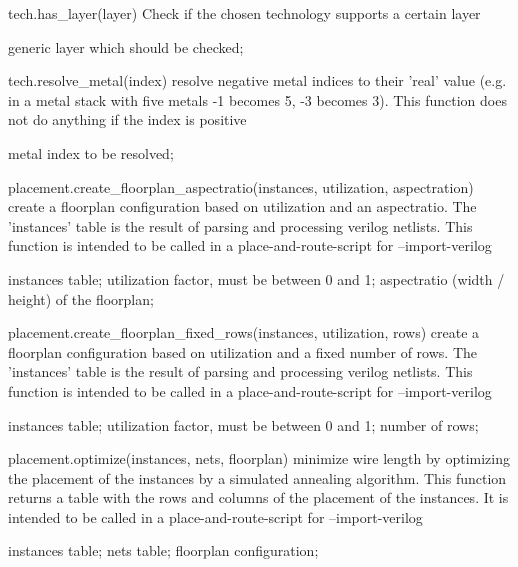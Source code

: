 \begin{APIfunc}{tech.has\_layer(layer)}
    Check if the chosen technology supports a certain layer
    \begin{APIparameters}
            generic layer which should be checked;
    \end{APIparameters}
\end{APIfunc}
\begin{APIfunc}{tech.resolve\_metal(index)}
    resolve negative metal indices to their 'real' value (e.g. in a metal stack with five metals -1 becomes 5, -3 becomes 3). This function does not do anything if the index is positive
    \begin{APIparameters}
            metal index to be resolved;
    \end{APIparameters}
\end{APIfunc}
\begin{APIfunc}{placement.create\_floorplan\_aspectratio(instances, utilization, aspectration)}
    create a floorplan configuration based on utilization and an aspectratio. The 'instances' table is the result of parsing and processing verilog netlists. This function is intended to be called in a place-and-route-script for --import-verilog
    \begin{APIparameters}
            instances table;
            utilization factor, must be between 0 and 1;
            aspectratio (width / height) of the floorplan;
    \end{APIparameters}
\end{APIfunc}
\begin{APIfunc}{placement.create\_floorplan\_fixed\_rows(instances, utilization, rows)}
    create a floorplan configuration based on utilization and a fixed number of rows. The 'instances' table is the result of parsing and processing verilog netlists. This function is intended to be called in a place-and-route-script for --import-verilog
    \begin{APIparameters}
            instances table;
            utilization factor, must be between 0 and 1;
            number of rows;
    \end{APIparameters}
\end{APIfunc}
\begin{APIfunc}{placement.optimize(instances, nets, floorplan)}
    minimize wire length by optimizing the placement of the instances by a simulated annealing algorithm. This function returns a table with the rows and columns of the placement of the instances. It is intended to be called in a place-and-route-script for --import-verilog
    \begin{APIparameters}
            instances table;
            nets table;
            floorplan configuration;
    \end{APIparameters}
\end{APIfunc}

